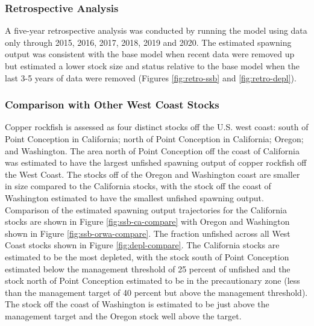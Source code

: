 \documentclass[11pt,
  english,
  a4paper,
]{article}
\begin{document}
\leavevmode\tagmcend\tagstructend\par


\hypertarget{retrospective-analysis}{%
\subsubsection{Retrospective Analysis}\label{retrospective-analysis}}

\leavevmode\tagmcend\tagstructend


A five-year retrospective analysis was conducted by running the model using data only through 2015, 2016, 2017, 2018, 2019 and 2020. The estimated spawning output was consistent with the base model when recent data were removed up but estimated a lower stock size and status relative to the base model when the last 3-5 years of data were removed (Figures \ref{fig:retro-ssb} and \ref{fig:retro-depl}).

\leavevmode\tagmcend\tagstructend\par


\hypertarget{comparison-with-other-west-coast-stocks}{%
\subsubsection{Comparison with Other West Coast Stocks}\label{comparison-with-other-west-coast-stocks}}

\leavevmode\tagmcend\tagstructend


Copper rockfish is assessed as four distinct stocks off the U.S. west coast: south of Point Conception in California; north of Point Conception in California; Oregon; and Washington. The area north of Point Conception off the coast of California was estimated to have the largest unfished spawning output of copper rockfish off the West Coast. The stocks off of the Oregon and Washington coast are smaller in size compared to the California stocks, with the stock off the coast of Washington estimated to have the smallest unfished spawning output. Comparison of the estimated spawning output trajectories for the California stocks are shown in Figure \ref{fig:ssb-ca-compare} with Oregon and Washington shown in Figure \ref{fig:ssb-orwa-compare}. The fraction unfished across all West Coast stocks shown in Figure \ref{fig:depl-compare}. The California stocks are estimated to be the most depleted, with the stock south of Point Conception estimated below the management threshold of 25 percent of unfished and the stock north of Point Conception estimated to be in the precautionary zone (less than the management target of 40 percent but above the management threshold). The stock off the coast of Washington is estimated to be just above the management target and the Oregon stock well above the target.
\end{document}
